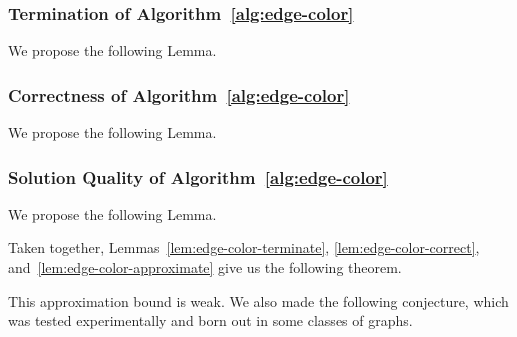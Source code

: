 \subsubsection{Termination of Algorithm~\ref{alg:edge-color}}

We propose the following Lemma.



\subsubsection{Correctness of Algorithm~\ref{alg:edge-color}}

We propose the following Lemma.



\subsubsection{Solution Quality of Algorithm~\ref{alg:edge-color}}

We propose the following Lemma.



Taken together, Lemmas~\ref{lem:edge-color-terminate}, \ref{lem:edge-color-correct}, and~\ref{lem:edge-color-approximate} give us the following theorem.



This approximation bound is weak. We also made the following conjecture, which was tested experimentally and born out in some classes of graphs.


